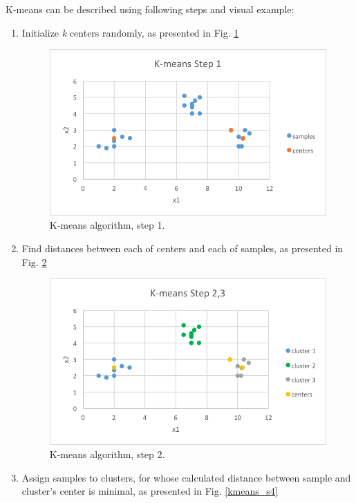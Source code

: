 	K-means can be described using following steps and visual example:
	\begin{enumerate}
	
	\item Initialize \textit{k} centers randomly, as presented in Fig. \ref{kmeans_s1}
	\begin{figure}[H]
	\begin{center}
	\includegraphics[width=0.8\linewidth]{images/kmeans1.png}
	\caption{K-means algorithm, step 1.}
	\label{kmeans_s1}
	\end{center}
	\end{figure}
	
	\item Find distances between each of centers and each of samples, as presented in Fig. \ref{kmeans_s2}
	\begin{figure}[H]
	\begin{center}
	\includegraphics[width=0.8\linewidth]{images/kmeans2.png}
	\caption{K-means algorithm, step 2.}
	\label{kmeans_s2}
	\end{center}
	\end{figure}
	
	\item Assign samples to clusters, for whose calculated distance between sample and cluster's center is minimal, as presented in Fig. \ref{kmeans_s4}
	

\end{enumerate}
